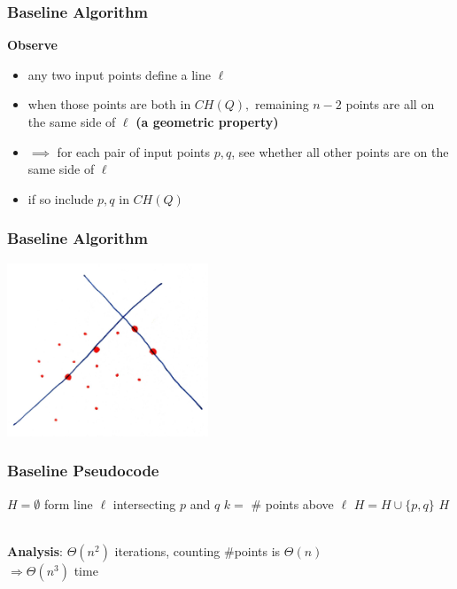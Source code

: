 \documentclass{beamer}
\newcommand{\stanza}{ \\~\ }
\begin{document}
\begin{frame} \frametitle{Baseline Algorithm}
\textbf{Observe}
\begin{itemize}
  \item any two input points define a line $\ell$
  \item when those points are both in $CH(Q),$ remaining $n-2$ points are all on
    the same side of $\ell$ \textbf{(a geometric property)}
  \item $\implies$ for each pair of input points $p, q$, see whether all other points
    are on the same side of $\ell$
  \item if so include $p, q$ in $CH(Q)$
\end{itemize}
\end{frame}

\begin{frame} \frametitle{Baseline Algorithm}
  \begin{center}
    \includegraphics[width=6cm]{convex_hull_line.jpg}
  \end{center}
\end{frame}
  
\begin{frame} \frametitle{Baseline Pseudocode}
  {\small
\begin{algorithmic}[1]
    \State $H=\emptyset$
      \State form line $\ell$ intersecting $p$ and $q$
      \State $k = $ \# points above $\ell$
        \State $H = H \cup \{p, q\}$
      \EndIf
    \EndFor
    \State \Return $H$
  \EndFunction \stanza
\end{algorithmic}
}

\textbf{Analysis}: $\Theta(n^2)$ iterations, counting \#points is $\Theta(n)$ \\
$\Longrightarrow \Theta(n^3)$ time
\end{frame}
\end{document}
